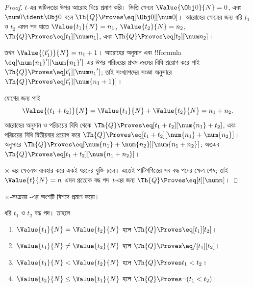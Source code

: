 \documentclass[../../../include/open-logic-section]{subfiles}
\begin{document}
\begin{proof}
$t$-এর জটিলতার উপর আরোহ দিয়ে প্রমাণ করি। ভিত্তি ক্ষেত্রে
$\Value{\Obj 0}{N} = 0$, এবং $\num 0 \ident \Obj 0$ বলে
$\Th{Q} \Proves \eq[\Obj 0][\num 0]$।
%
আরোহের ক্ষেত্রের জন্য ধরি $t_1$ ও $t_2$ এমন পদ যাতে
$\Value{t_1}{N} = n_1$, $\Value{t_2}{N} = n_2$,
$\Th{Q} \Proves \eq[t_1][\num n_1]$, এবং
$\Th{Q} \Proves \eq[t_2][\num n_2]$।

তখন $\Value{(t_1')}{N} = n_1 + 1$। আরোহের অনুমান এবং
!!{formula} $\eq[\num{n_1}'][\num{n_1}']$-এর উপর পরিচয়ের প্রথম-ক্রমের বিধি
প্রয়োগ করে পাই $\Th{Q} \Proves \eq[t_1'][{\num n_1}']$; তাই সংখ্যাপদের
সংজ্ঞা অনুসারে $\Th{Q} \Proves \eq[t_1'][\num{n_1 + 1}]$।

যোগের জন্য পাই
\[
      \Value{(t_1 + t_2)}{N}
    = \Value{t_1}{N} + \Value{t_2}{N}
    = n_1 + n_2.
\]
আরোহের অনুমান ও পরিচয়ের বিধি থেকে
$\Th{Q} \Proves \eq[t_1 + t_2][\num{n_1} + t_2]$, এবং পরিচয়ের বিধি
দ্বিতীয়বার প্রয়োগ করে
$\Th{Q} \Proves \eq[t_1 + t_2][\num{n_1} + \num{n_2}]$।
 অনুসারে
$\Th{Q} \Proves \eq[\num{n_1} + \num{n_2}][\num{n_1 + n_2}]$;
অতএব $\Th{Q} \Proves \eq[t_1 + t_2][\num{n_1 + n_2}]$।

$\times$-এর ক্ষেত্রেও  ব্যবহার করে
একই ধরনের যুক্তি চলে।
%
এতেই পাটিগণিতের সব বদ্ধ পদের ক্ষেত্র শেষ; তাই
$\Value{t}{N} = n$ এমন প্রত্যেক বদ্ধ পদ~$t$-এর জন্য
$\Th{Q} \Proves \eq[t][\num n]$।
\end{proof}

\begin{prob}
$\times$-সংক্রান্ত -এর অংশটি বিশদে প্রমাণ করো।
\end{prob}

\begin{lem}
ধরি $t_1$ ও $t_2$ বদ্ধ পদ। তাহলে
\begin{enumerate}
\item $\Value{t_1}{N} = \Value{t_2}{N}$ হলে
    $\Th{Q} \Proves \eq[t_1][t_2]$।
\item $\Value{t_1}{N} \neq \Value{t_2}{N}$ হলে
    $\Th{Q} \Proves \eq/[t_1][t_2]$।
\item $\Value{t_1}{N} < \Value{t_2}{N}$ হলে
    $\Th{Q} \Proves t_1 < t_2$।
\item $\Value{t_2}{N} \leq \Value{t_1}{N}$ হলে
    $\Th{Q} \Proves \lnot(t_1 < t_2)$।
\end{enumerate}
\end{lem}
\end{document}
